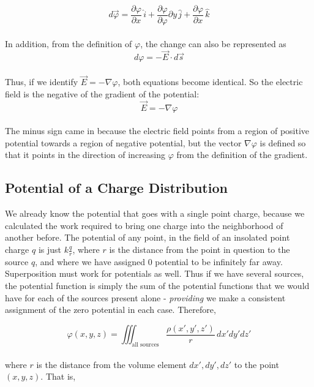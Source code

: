 \documentclass[svgnames]{article}
\begin{document}
\[d\vec{\varphi} = \frac{\partial \varphi}{\partial x} \, \hat{i}
+ \frac{\partial \varphi}{\partial \varphi}{\partial y} \, \hat{j}
+ \frac{\partial \varphi}{\partial x} \, \hat{k} \] \\

In addition, from the definition of $\varphi$, the change can also be represented as \\

\[ d\varphi = - \vec{E} \cdot d\vec{s} \] \\

Thus, if we identify $\vec{E} = - \nabla \varphi$, both equations become
identical. So the electric field is the negative of the gradient of the
potential:\\

 \[ \vec{E} = - \nabla \varphi \] \\
 
 The minus sign came in because the electric field points from a region of
 positive potential towards a region of negative potential, but the vector
 $\nabla \varphi$ is defined so that it points in the direction of increasing
 $\varphi$ from the definition of the gradient. \\
 
 \subsection{Potential of a Charge Distribution}
 
 We already know the potential that goes with a single point charge, because we
 calculated the work required to bring one charge into the neighborhood of
 another before. The potential of any point, in the field of an insolated point
 charge $q$ is just $k\frac{q}{r}$, where $r$ is the distance from the point in
 question to the source $q$, and where we have assigned 0 potential to be
 infinitely far away.  \\
 
 Superposition must work for potentials as well. Thus if we have several
 sources, the potential function is simply the sum of the potential functions
 that we would have for each of the sources present alone - \textit{providing}
 we make a consistent assignment of the zero potential in each case. Therefore,
 
 \[ \varphi(x, y, z) = \iiint_\text{all sources} \frac{\rho (x', y', z')}{r} \,
 dx'dy'dz' \] \\
 
 where $r$ is the distance from the volume element $dx', dy', dz'$ to the point $(x, y, z)$. That is, 
 
\end{document}
